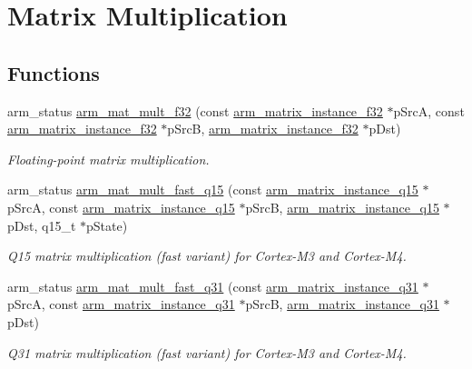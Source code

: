 \hypertarget{group___matrix_mult}{\section{Matrix Multiplication}
\label{group___matrix_mult}
}
\subsection*{Functions}
\begin{DoxyCompactItemize}
\item 
arm\-\_\-status \hyperlink{group___matrix_mult_ga917bf0270310c1d3f0eda1fc7c0026a0}{arm\-\_\-mat\-\_\-mult\-\_\-f32} (const \hyperlink{structarm__matrix__instance__f32}{arm\-\_\-matrix\-\_\-instance\-\_\-f32} $\ast$p\-Src\-A, const \hyperlink{structarm__matrix__instance__f32}{arm\-\_\-matrix\-\_\-instance\-\_\-f32} $\ast$p\-Src\-B, \hyperlink{structarm__matrix__instance__f32}{arm\-\_\-matrix\-\_\-instance\-\_\-f32} $\ast$p\-Dst)
\begin{DoxyCompactList}\small\item\em Floating-\/point matrix multiplication. \end{DoxyCompactList}\item 
arm\-\_\-status \hyperlink{group___matrix_mult_ga08f37d93a5bfef0c5000dc5e0a411f93}{arm\-\_\-mat\-\_\-mult\-\_\-fast\-\_\-q15} (const \hyperlink{structarm__matrix__instance__q15}{arm\-\_\-matrix\-\_\-instance\-\_\-q15} $\ast$p\-Src\-A, const \hyperlink{structarm__matrix__instance__q15}{arm\-\_\-matrix\-\_\-instance\-\_\-q15} $\ast$p\-Src\-B, \hyperlink{structarm__matrix__instance__q15}{arm\-\_\-matrix\-\_\-instance\-\_\-q15} $\ast$p\-Dst, q15\-\_\-t $\ast$p\-State)
\begin{DoxyCompactList}\small\item\em Q15 matrix multiplication (fast variant) for Cortex-\/\-M3 and Cortex-\/\-M4. \end{DoxyCompactList}\item 
arm\-\_\-status \hyperlink{group___matrix_mult_ga2785e8c1b785348b0c439b56aaf585a3}{arm\-\_\-mat\-\_\-mult\-\_\-fast\-\_\-q31} (const \hyperlink{structarm__matrix__instance__q31}{arm\-\_\-matrix\-\_\-instance\-\_\-q31} $\ast$p\-Src\-A, const \hyperlink{structarm__matrix__instance__q31}{arm\-\_\-matrix\-\_\-instance\-\_\-q31} $\ast$p\-Src\-B, \hyperlink{structarm__matrix__instance__q31}{arm\-\_\-matrix\-\_\-instance\-\_\-q31} $\ast$p\-Dst)
\begin{DoxyCompactList}\small\item\em Q31 matrix multiplication (fast variant) for Cortex-\/\-M3 and Cortex-\/\-M4. \end{DoxyCompactList}\item 

\end{DoxyCompactItemize}
